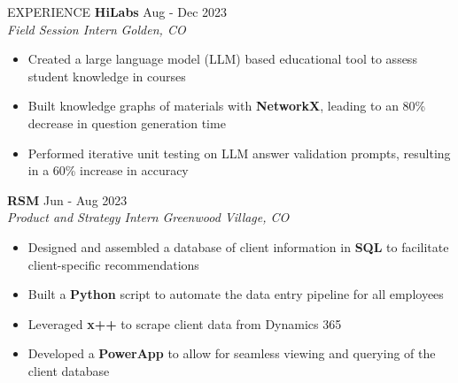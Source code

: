 \documentclass{resume} %
\begin{document}
\begin{rSection}{EXPERIENCE}
 \textbf{HiLabs} \hfill Aug - Dec 2023\\
\textit{Field Session Intern} \hfill \textit{Golden, CO}
\vspace{-8pt}
 \begin{itemize}[leftmargin=*]
    \itemsep -7pt {}
    \item Created a large language model (LLM) based educational tool to assess student knowledge in courses
    \item Built knowledge graphs of materials with \textbf{NetworkX}, leading to an 80\% decrease in question generation time
    \item Performed iterative unit testing on LLM answer validation prompts, resulting in a 60\% increase in accuracy
 \end{itemize}
\vspace{-4pt}

\textbf{RSM} \hfill Jun - Aug 2023\\
\textit{Product and Strategy Intern} \hfill \textit{Greenwood Village, CO}
\vspace{-8pt}
 \begin{itemize}[leftmargin=*]
    \itemsep -7pt {}
     \item Designed and assembled a database of client information in \textbf{SQL} to facilitate client-specific recommendations
     \item Built a \textbf{Python} script to automate the data entry pipeline for all employees
     \item Leveraged \textbf{x++} to scrape client data from Dynamics 365
     \item Developed a \textbf{PowerApp} to allow for seamless viewing and querying of the client database
 \end{itemize}

\end{rSection}

\end{document}
